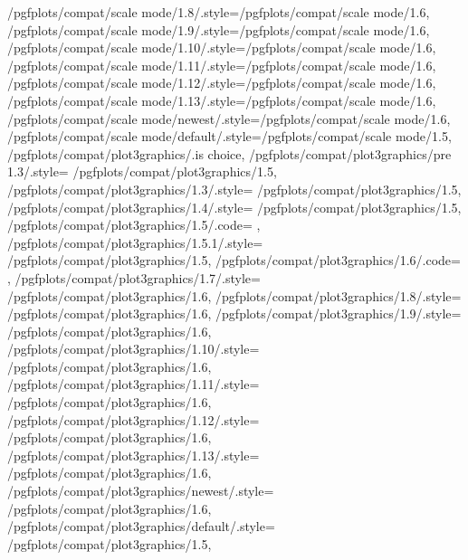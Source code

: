 {	/pgfplots/compat/scale mode/1.8/.style={/pgfplots/compat/scale mode/1.6},
	/pgfplots/compat/scale mode/1.9/.style={/pgfplots/compat/scale mode/1.6},
	/pgfplots/compat/scale mode/1.10/.style={/pgfplots/compat/scale mode/1.6},
	/pgfplots/compat/scale mode/1.11/.style={/pgfplots/compat/scale mode/1.6},
	/pgfplots/compat/scale mode/1.12/.style={/pgfplots/compat/scale mode/1.6},
	/pgfplots/compat/scale mode/1.13/.style={/pgfplots/compat/scale mode/1.6},
	/pgfplots/compat/scale mode/newest/.style={/pgfplots/compat/scale mode/1.6},
	/pgfplots/compat/scale mode/default/.style={/pgfplots/compat/scale mode/1.5},
	/pgfplots/compat/plot3graphics/.is choice,
	/pgfplots/compat/plot3graphics/pre 1.3/.style=	{/pgfplots/compat/plot3graphics/1.5},
	/pgfplots/compat/plot3graphics/1.3/.style=		{/pgfplots/compat/plot3graphics/1.5},
	/pgfplots/compat/plot3graphics/1.4/.style=		{/pgfplots/compat/plot3graphics/1.5},%
	/pgfplots/compat/plot3graphics/1.5/.code=		{\def\b@pgfplots@compat@plot@graphics@threedim{1}},%
	/pgfplots/compat/plot3graphics/1.5.1/.style=	{/pgfplots/compat/plot3graphics/1.5},%
	/pgfplots/compat/plot3graphics/1.6/.code=		{\def\b@pgfplots@compat@plot@graphics@threedim{2}},%
	/pgfplots/compat/plot3graphics/1.7/.style=	{/pgfplots/compat/plot3graphics/1.6},%
	/pgfplots/compat/plot3graphics/1.8/.style=	{/pgfplots/compat/plot3graphics/1.6},%
	/pgfplots/compat/plot3graphics/1.9/.style=	{/pgfplots/compat/plot3graphics/1.6},%
	/pgfplots/compat/plot3graphics/1.10/.style=	{/pgfplots/compat/plot3graphics/1.6},%
	/pgfplots/compat/plot3graphics/1.11/.style=	{/pgfplots/compat/plot3graphics/1.6},%
	/pgfplots/compat/plot3graphics/1.12/.style=	{/pgfplots/compat/plot3graphics/1.6},%
	/pgfplots/compat/plot3graphics/1.13/.style=	{/pgfplots/compat/plot3graphics/1.6},%
	/pgfplots/compat/plot3graphics/newest/.style=	{/pgfplots/compat/plot3graphics/1.6},%
	/pgfplots/compat/plot3graphics/default/.style=	{/pgfplots/compat/plot3graphics/1.5},%
}
